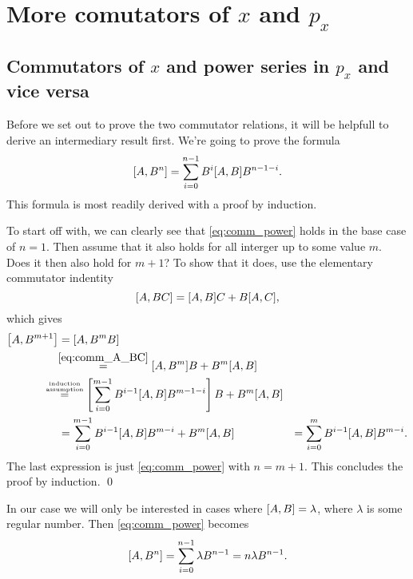 \documentclass[11pt,letter, swedish, english
]{article}
\begin{document}
\section{More comutators of $x$ and $p_x$}

\subsection{Commutators of $x$ and power series in $p_x$ and vice versa}
Before we set out to prove the two commutator relations, it will be
helpfull to derive an intermediary result first. We're going to prove
the formula
\begin{equation} \label{eq:comm_power}
\comm{A}{B^n} = \sum_{i=0}^{n-1} B^{i}\comm{A}{B}B^{n-1-i}.
\end{equation}
This formula is most readily derived with a proof by induction. 

To start off with, we can clearly see that \eqref{eq:comm_power} holds
in the base case of $n=1$. Then assume that it also holds for all
interger up to some value $m$. Does it then also hold for $m+1$?
To show that it does, use the elementary commutator
indentity
\begin{equation} \label{eq:comm_A_BC}
\comm{A}{BC} = \comm{A}{B}C+B\comm{A}{C},
\end{equation}
which gives
\begin{equation}
\begin{aligned}
\comm{A}{B^{m+1}} &= \comm{A}{B^{m}B} \\
&\hspace{-3pt}\stackrel{\eqref{eq:comm_A_BC}}{=} \comm{A}{B^{m}}B + B^m\comm{A}{B}\\
&\hspace{-14pt}\stackrel{\stackrel{\text{\tiny induction}}{\text{\tiny assumption}}}{=}
\left[\sum_{i=0}^{m-1} B^{i-1}\comm{A}{B}B^{m-1-i}\right]B + B^m\comm{A}{B}\\
&=\sum_{i=0}^{m-1} B^{i-1}\comm{A}{B}B^{m-i} + B^m\comm{A}{B}&=\sum_{i=0}^{m} B^{i-1}\comm{A}{B}B^{m-i}.
\end{aligned}
\end{equation}
The last expression is just \eqref{eq:comm_power} with $n=m+1$. This
concludes the proof by induction. \qed

In our case we will only be interested in cases where $\comm{A}{B}=\lambda$,
where $\lambda$ is some regular number. Then \eqref{eq:comm_power} becomes
\begin{equation} \label{eq:comm_power_c}
\comm{A}{B^n} = \sum_{i=0}^{n-1} \lambda B^{n-1} = n\lambda B^{n-1}.
\end{equation}
\end{document}
